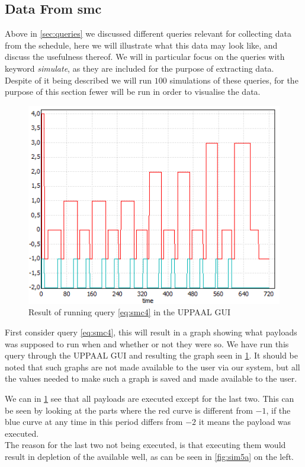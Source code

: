 \subsection{Data From \gls{smc}}
Above in \cref{sec:queries} we discussed different queries relevant for collecting data from the schedule, here we will illustrate what this data may look like, and discuss the usefulness thereof. We will in particular focus on the queries with keyword \textit{simulate}, as they are included for the purpose of extracting data. Despite of it being described we will run $100$ simulations of these queries, for the purpose of this section fewer will be run in order to visualise the data. 

\begin{figure}[h]
	\centering
	\includegraphics[scale=0.8]{graphics/active_running.png}
	\caption{Result of running query \ref{eq:smc4} in the UPPAAL GUI}
	\label{fig:active_running}
\end{figure}

First consider query \cref{eq:smc4}, this will result in a graph showing what payloads was supposed to run when and whether or not they were so. We have run this query through the UPPAAL GUI and resulting the graph seen in \cref{fig:active_running}. It should be noted that such graphs are not made available to the user via our system, but all the values needed to make such a graph is saved and made available to the user.

We can in \cref{fig:active_running} see that all payloads are executed except for the last two. This can be seen by looking at the parts where the red curve is different from $-1$, if the blue curve at any time in this period differs from $-2$ it means the payload was executed. \\
The reason for the last two not being executed, is that executing them would result in depletion of the available well, as can be seen in \cref{fig:sim5a} on the left. 

